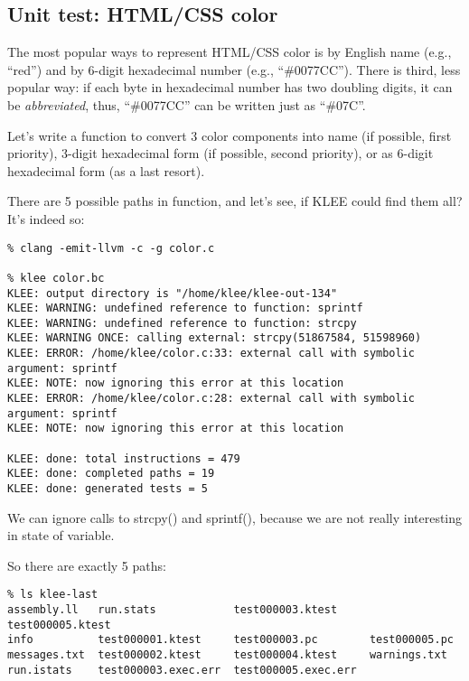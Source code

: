 \subsection{Unit test: HTML/CSS color}

The most popular ways to represent HTML/CSS color is by English name (e.g., ``red'') and by 6-digit hexadecimal number (e.g., ``\#0077CC'').
There is third, less popular way: if each byte in hexadecimal number has two doubling digits, it can be \textit{abbreviated}, thus, 
``\#0077CC'' can be written just as ``\#07C''.

Let's write a function to convert 3 color components into name (if possible, first priority), 3-digit hexadecimal form (if possible, second priority),
or as 6-digit hexadecimal form (as a last resort).



There are 5 possible paths in function, and let's see, if KLEE could find them all?
It's indeed so:

\begin{lstlisting}
% clang -emit-llvm -c -g color.c

% klee color.bc
KLEE: output directory is "/home/klee/klee-out-134"
KLEE: WARNING: undefined reference to function: sprintf
KLEE: WARNING: undefined reference to function: strcpy
KLEE: WARNING ONCE: calling external: strcpy(51867584, 51598960)
KLEE: ERROR: /home/klee/color.c:33: external call with symbolic argument: sprintf
KLEE: NOTE: now ignoring this error at this location
KLEE: ERROR: /home/klee/color.c:28: external call with symbolic argument: sprintf
KLEE: NOTE: now ignoring this error at this location

KLEE: done: total instructions = 479
KLEE: done: completed paths = 19
KLEE: done: generated tests = 5
\end{lstlisting}

We can ignore calls to strcpy() and sprintf(), because we are not really interesting in state of  variable.

So there are exactly 5 paths:

\begin{lstlisting}
% ls klee-last
assembly.ll   run.stats            test000003.ktest     test000005.ktest
info          test000001.ktest     test000003.pc        test000005.pc
messages.txt  test000002.ktest     test000004.ktest     warnings.txt
run.istats    test000003.exec.err  test000005.exec.err
\end{lstlisting}

